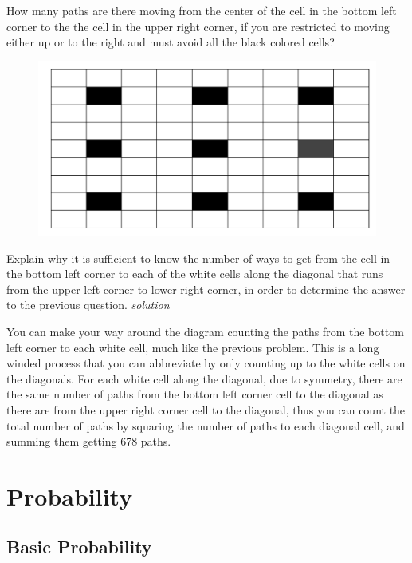 \documentclass{amsbook}
\begin{document}
\begin{Exercise}[title={Cell-to-Cell III}, difficulty=2, label=c7]
    \Question How many paths are there moving from the center of the cell in the bottom left corner to the the cell in the upper right corner, if you are restricted to moving either up or to the right and must avoid all the black colored cells?
     \begin{figure}[H]
        \includegraphics[width=.8\linewidth]{g.png}
    \end{figure}
    \Question Explain why it is sufficient to know the number of ways to get from the cell in the bottom left corner to each of the white cells along the diagonal that runs from the upper left corner to lower right corner, in order to determine the answer to the previous question. \hfill \emph{solution} 
\end{Exercise}

\begin{Answer}[ref={c7}]
    You can make your way around the diagram counting the paths from the bottom left corner to each white cell, much like the previous problem. This is a long winded process that you can abbreviate by only counting up to the white cells on the diagonals. For each white cell along the diagonal, due to symmetry, there are the same number of paths from the bottom left corner cell to the diagonal as there are from the upper right corner cell to the diagonal, thus you can count the total number of paths by squaring the number of paths to each diagonal cell, and summing them getting 678 paths.
\end{Answer}

\chapter{Probability}

\section{Basic Probability}
\end{document}
